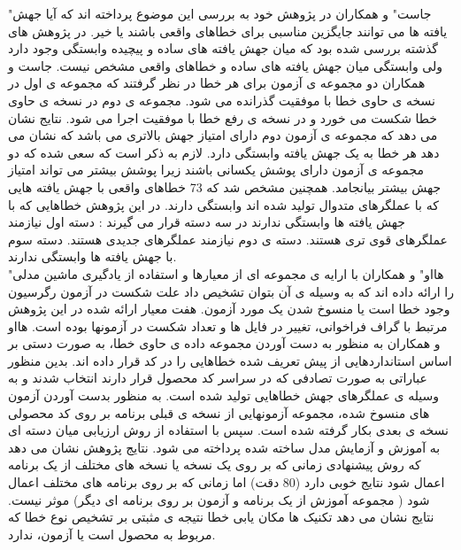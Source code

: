 "جاست" و همکاران در پژوهش خود به بررسی این موضوع پرداخته اند که آیا جهش یافته ها می توانند جایگزین مناسبی برای خطاهای واقعی باشند یا خیر\cite{just2014mutants}. در پژوهش های گذشته بررسی شده بود که میان جهش یافته های ساده و پیچیده وابستگی وجود دارد ولی وابستگی میان جهش یافته های ساده و خطاهای واقعی مشخص نیست. جاست و همکاران دو مجموعه ی آزمون برای هر خطا در نظر گرفتند که مجموعه ی اول در نسخه ی حاوی خطا با موفقیت گذرانده می شود. مجموعه ی دوم در نسخه ی حاوی خطا شکست می خورد و در نسخه ی رفع خطا با موفقیت اجرا می شود. نتایج نشان می دهد که مجموعه ی آزمون دوم دارای امتیاز جهش بالاتری می باشد که نشان می دهد هر خطا به یک جهش یافته وابستگی دارد. لازم به ذکر است که سعی شده که دو مجموعه ی آزمون دارای پوشش یکسانی باشند زیرا پوشش بیشتر می تواند امتیاز جهش بیشتر بیانجامد. همچنین مشخص شد که  
73 \lr{\%} 
 خطاهای واقعی با جهش یافته هایی که  با عملگرهای متدوال تولید شده اند وابستگی دارند. در این پژوهش خطاهایی که با جهش یافته ها وابستگی ندارند در سه دسته قرار می گیرند : دسته اول نیازمند عملگرهای قوی تری هستند. دسته ی دوم نیازمند عملگرهای جدیدی هستند. دسته سوم با جهش یافته ها وابستگی ندارند.\\
 
 "هااو" و همکاران با ارایه ی مجموعه ای از معیارها و استفاده از یادگیری ماشین مدلی را ارائه داده اند که به وسیله ی آن بتوان تشخیص داد علت شکست در آزمون رگرسیون وجود خطا است یا منسوخ  شدن یک مورد آزمون. هفت معیار ارائه شده در این پژوهش مرتبط با گراف فراخوانی، تغییر در فایل ها و تعداد شکست در آزمونها بوده است.  هااو و همکاران به منظور به دست آوردن مجموعه داده ی حاوی خطا، به صورت دستی بر اساس استانداردهایی  از پیش تعریف شده خطاهایی را در کد قرار داده اند. بدین منظور عباراتی به صورت تصادفی که در سراسر کد محصول قرار دارند انتخاب شدند و به وسیله ی عملگرهای جهش خطاهایی تولید شده است. به منظور بدست آوردن آزمون های منسوخ شده، مجموعه آزمونهایی از نسخه ی قبلی برنامه بر روی کد محصولی نسخه ی بعدی بکار گرفته شده است. سپس با استفاده از روش ارزیابی میان دسته ای به آموزش و آزمایش مدل ساخته شده پرداخته می شود. نتایج پژوهش نشان می دهد که روش پیشنهادی زمانی که بر روی یک نسخه یا نسخه های مختلف از یک برنامه اعمال شود نتایج خوبی دارد (80\lr{\%} دقت) اما زمانی که بر روی برنامه های مختلف اعمال شود ( مجموعه آموزش از یک برنامه و آزمون بر روی برنامه ای دیگر) موثر نیست. نتایج نشان می دهد تکنیک ها مکان یابی خطا نتیجه ی مثبتی بر تشخیص نوع خطا که مربوط به محصول است یا آزمون، ندارد.\\
 
